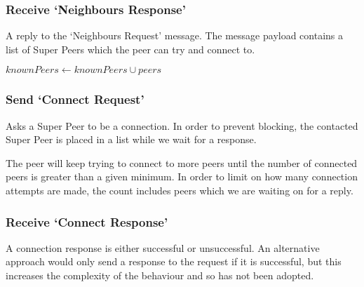 \subsubsection{Receive `Neighbours Response'}

A reply to the `Neighbours Request' message. The message payload contains a
list of Super Peers which the peer can try and connect to.

\begin{algorithm}[H]

  $knownPeers \leftarrow knownPeers \cup  peers$\;
\end{algorithm}

\subsubsection{Send `Connect Request'}

Asks a Super Peer to be a connection. In order to prevent blocking, the
contacted Super Peer is placed in a list while we wait for a response. 

The peer will keep trying to connect to more peers until the number of connected
peers is greater than a given minimum. In order to limit on how many connection
attempts are made, the count includes peers which we are waiting on for a reply.

\begin{algorithm}[H]

\end{algorithm}

\subsubsection{Receive `Connect Response'}

A connection response is either successful or unsuccessful.  An alternative
approach would only send a response to the request if it is successful, but this
increases the complexity of the behaviour and so has not been adopted.

